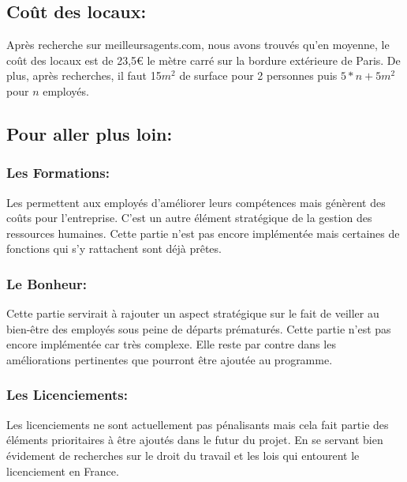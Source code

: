 \subsection{Coût des locaux:}



Après recherche sur meilleursagents.com, nous avons trouvés qu’en moyenne, le coût des locaux est de 23,5\euro{} le mètre carré sur la bordure extérieure de Paris. De plus, après recherches, il faut 15$m^{2}$ de surface pour 2 personnes puis $5*n+5 m^{2}$ pour $n$ employés.



\subsection{Pour aller plus loin:}



\subsubsection*{Les Formations:}



Les permettent aux employés d’améliorer leurs compétences mais génèrent des coûts pour l’entreprise. C’est un autre élément stratégique de la gestion des ressources humaines. Cette partie n’est pas encore implémentée mais certaines de fonctions qui s’y rattachent sont déjà prêtes.



\subsubsection*{Le Bonheur:}



Cette partie servirait à rajouter un aspect stratégique sur le fait de veiller au bien-être des employés sous peine de départs prématurés. Cette partie n’est pas encore implémentée car très complexe. Elle reste par contre dans les améliorations pertinentes que pourront être ajoutée au programme.



\subsubsection*{Les Licenciements:}


Les licenciements ne sont actuellement pas pénalisants mais cela fait partie des éléments prioritaires à être ajoutés dans le futur du projet. En se servant bien évidement de recherches sur le droit du travail et les lois qui entourent le licenciement en France.







